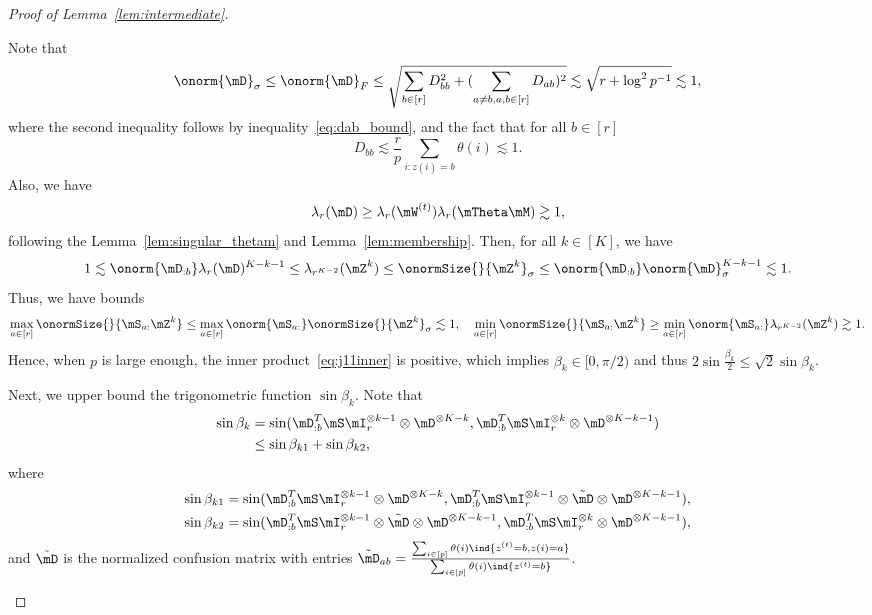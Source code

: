 \documentclass[lettersize,onecolumn,journal]{IEEEtran}
\theoremstyle{definition}
\theoremstyle{definition}
\begin{document}
\begin{proof}[Proof of Lemma~\ref{lem:intermediate}]
\begin{enumerate}
    Note that 
    \begin{equation}\label{eq:singular_Du}
        \onorm{\mD}_{\sigma} \leq \onorm{\mD}_{F} \leq  \sqrt{\sum_{b \in [r]} D_{bb}^2 + (\sum_{a \neq b, a ,b \in [r]} D_{ab} )^2} \lesssim \sqrt{r  + \log^2 p^{-1}} \lesssim 1,
    \end{equation}
    where the second inequality follows by inequality~\eqref{eq:dab_bound}, and the fact that for all $b \in [r]$ 
    \begin{equation}
        D_{bb} \lesssim \frac{r}{p} \sum_{i\colon z(i) = b} \theta(i) \lesssim 1.
    \end{equation}
    Also, we have 
    \begin{equation}\label{eq:singular_Dl}
        \lambda_r(\mD) \geq \lambda_r(\mW^{(t)}) \lambda_r(\mTheta \mM) \gtrsim 1,
    \end{equation}
    following the Lemma~\ref{lem:singular_thetam} and Lemma~\ref{lem:membership}. Then, for all $k \in [K]$, we have 
    \begin{equation}\label{eq:singular_z}
       1 \lesssim \onorm{\mD_{:b}} \lambda_r(\mD)^{K-k-1}  \leq \lambda_{r^{K-2}}(\mZ^{k}) \leq \onormSize{}{\mZ^k}_{\sigma} \leq \onorm{\mD_{:b}} \onorm{\mD}_{\sigma}^{K-k-1} \lesssim 1.
    \end{equation}
    Thus, we have bounds 
    \begin{equation}
         \max_{a \in [r]} \onormSize{}{\mS_{a:} \mZ^k} \leq \max_{a \in [r]} \onorm{\mS_{a:}} \onormSize{}{\mZ^k}_{\sigma} \lesssim 1, \quad \min_{a \in [r]} \onormSize{}{\mS_{a:}\mZ^k}  \geq \min_{a \in [r]} \onorm{\mS_{a:}} \lambda_{r^{K-2}}(\mZ^{k}) \gtrsim 1.
    \end{equation}
    Hence, when $p$ is large enough, the inner product~\eqref{eq:j11inner} is positive, which implies $\beta_k \in [0, \pi/2)$ and thus $2 \sin \frac{\beta_k}{2} \leq \sqrt{2} \sin \beta_k$.
    
    Next, we upper bound the trigonometric function $\sin \beta_k$. Note that
    \begin{align}
         \sin \beta_k &= \sin ({\mD_{:b}^{T} \mS \mI_r^{\otimes k-1} \otimes \mD^{\otimes K-k} }, {\mD_{:b}^{T} \mS \mI_r^{\otimes k} \otimes \mD^{\otimes K-k-1} } )\\
         &\leq \sin \beta_{k1} + \sin \beta_{k2},
    \end{align}
    where
    \begin{align}
         \sin \beta_{k1} &= \sin ({\mD_{:b}^{T} \mS \mI_r^{\otimes k-1} \otimes \mD^{\otimes K-k} }, {\mD_{:b}^{T} \mS \mI_r^{\otimes k-1} \otimes \tilde \mD \otimes \mD^{\otimes K-k-1} } ),\\
         \sin \beta_{k2} & = \sin ({\mD_{:b}^{T} \mS \mI_r^{\otimes k-1} \otimes \tilde \mD \otimes \mD^{\otimes K-k-1} } , {\mD_{:b}^{T} \mS \mI_r^{\otimes k} \otimes \mD^{\otimes K-k-1} }   ),
    \end{align}
    and $\tilde \mD$ is the normalized confusion matrix with entries $\tilde \mD_{ab} = \frac{\sum_{i \in [p]} \theta(i) \ind\{z^{(t)} = b, z(i) = a\}}{\sum_{i \in [p] }\theta(i) \ind\{z^{(t)} = b\}}$.
    

\end{enumerate}
\end{proof}
\end{document}
